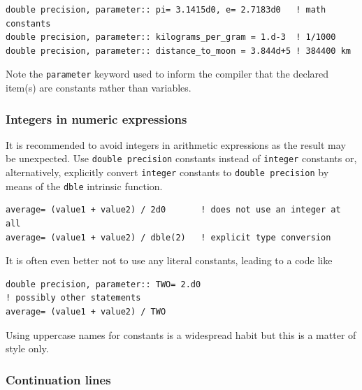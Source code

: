 \documentclass[times,onecolumn]{article}
\begin{document}
\begin{shaded}
\begin{small}
\begin{verbatim}
double precision, parameter:: pi= 3.1415d0, e= 2.7183d0   ! math constants 
double precision, parameter:: kilograms_per_gram = 1.d-3  ! 1/1000
double precision, parameter:: distance_to_moon = 3.844d+5 ! 384400 km
\end{verbatim}
\end{small}
\end{shaded}

Note the \verb|parameter| keyword used to inform the compiler that the declared item(s) are constants rather than variables.

\subsubsection{Integers in numeric expressions}

It is recommended to avoid integers in arithmetic expressions as the result may be unexpected. Use \verb|double precision| constants instead of \verb|integer| constants or, alternatively, explicitly convert \verb|integer| constants to \verb|double precision| by means of the \verb|dble| intrinsic function.

\begin{shaded}
\begin{small}
\begin{verbatim}
average= (value1 + value2) / 2d0       ! does not use an integer at all
average= (value1 + value2) / dble(2)   ! explicit type conversion
\end{verbatim}
\end{small}
\end{shaded}

It is often even better not to use any literal constants, leading to a code like

\begin{shaded}
\begin{small}
\begin{verbatim}
double precision, parameter:: TWO= 2.d0
! possibly other statements
average= (value1 + value2) / TWO
\end{verbatim}
\end{small}
\end{shaded}

Using uppercase names for constants is a widespread habit but this is a matter of style only.

\subsubsection{Continuation lines}
\end{document}
